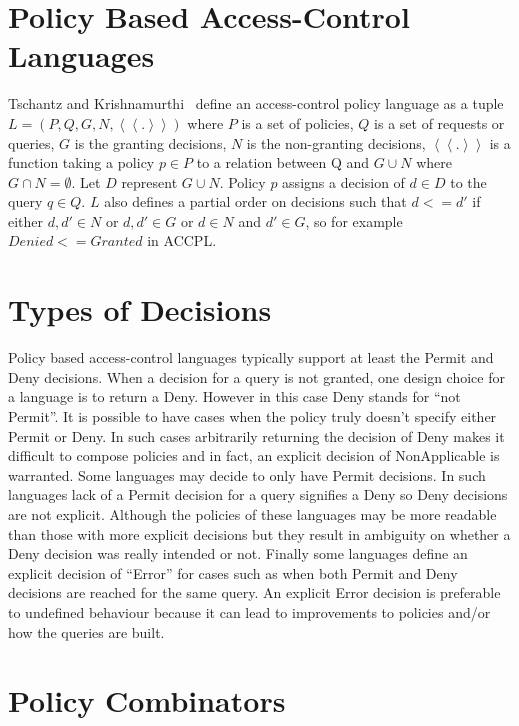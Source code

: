\section{Policy Based Access-Control Languages}

Tschantz and Krishnamurthi~\cite{Tschantz} define an access-control policy language as a tuple $L = (P, Q, G, N, \left\langle\left\langle . \right\rangle\right\rangle)$ where $P$ is a set of policies, $Q$ is a set of requests or queries, $G$ is the granting decisions, $N$ is the non-granting decisions, $\left\langle\left\langle . \right\rangle\right\rangle$ is a function taking a policy $p \in P$ to a relation between Q and $G \cup N$ where $G \cap N = \emptyset$. Let $D$ represent $G \cup N$. Policy $p$ assigns a decision of $d \in D$ to the query $q \in Q$. $L$ also defines a partial order on decisions such that $d <= d'$ if either $d, d' \in N$ or $d, d' \in G$ or $d \in N$ and $d' \in G$, so for example $Denied <= Granted$ in \ac{ACCPL}.

\section{Types of Decisions}

Policy based access-control languages typically support at least the Permit and Deny decisions. When a decision for a query is not granted, one design choice for a language is to return a Deny. However in this case Deny stands for ``not Permit''. It is possible to have cases when the policy truly doesn't specify either Permit or Deny. In such cases arbitrarily returning the decision of Deny makes it difficult to compose policies and in fact, an explicit decision of NonApplicable is warranted. Some languages may decide to only have Permit decisions. In such languages lack of a Permit decision for a query signifies a Deny so Deny decisions are not explicit. Although the policies of these languages may be more readable than those with more explicit decisions but they result in ambiguity on whether a Deny decision was really intended or not. Finally some languages define an explicit decision of ``Error'' for cases such as when both Permit and Deny decisions are reached for the same query. An explicit Error decision is preferable to undefined behaviour because it can lead to improvements to policies and/or how the queries are built. 

\section{Policy Combinators}

